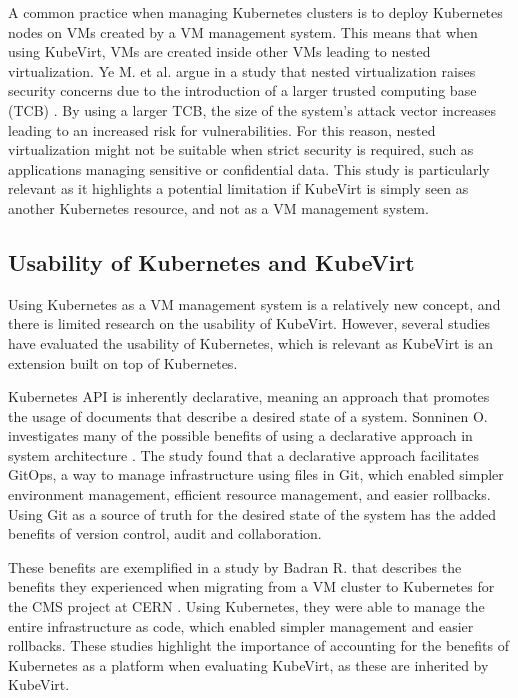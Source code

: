 \documentclass{article}
\begin{document}
A common practice when managing Kubernetes clusters is to deploy Kubernetes nodes on VMs created by a VM management system. This means that when using KubeVirt, VMs are created inside other VMs leading to nested virtualization. Ye M. et al. argue in a study that nested virtualization raises security concerns due to the introduction of a larger trusted computing base (TCB) \cite{free-turtles}. By using a larger TCB, the size of the system's attack vector increases leading to an increased risk for vulnerabilities. For this reason, nested virtualization might not be suitable when strict security is required, such as applications managing sensitive or confidential data. This study is particularly relevant as it highlights a potential limitation if KubeVirt is simply seen as another Kubernetes resource, and not as a VM management system. 

\subsection{Usability of Kubernetes and KubeVirt}
Using Kubernetes as a VM management system is a relatively new concept, and there is limited research on the usability of KubeVirt. However, several studies have evaluated the usability of Kubernetes, which is relevant as KubeVirt is an extension built on top of Kubernetes.

Kubernetes API is inherently declarative, meaning an approach that promotes the usage of documents that describe a desired state of a system. Sonninen O. investigates many of the possible benefits of using a declarative approach in system architecture \cite{declarative-benefits}. The study found that a declarative approach facilitates GitOps, a way to manage infrastructure using files in Git, which enabled simpler environment management, efficient resource management, and easier rollbacks. Using Git as a source of truth for the desired state of the system has the added benefits of version control, audit and collaboration.

These benefits are exemplified in a study by Badran R. that describes the benefits they experienced when migrating from a VM cluster to Kubernetes for the CMS project at CERN \cite{k8s-cern}. Using Kubernetes, they were able to manage the entire infrastructure as code, which enabled simpler management and easier rollbacks. These studies highlight the importance of accounting for the benefits of Kubernetes as a platform when evaluating KubeVirt, as these are inherited by KubeVirt.
\end{document}
